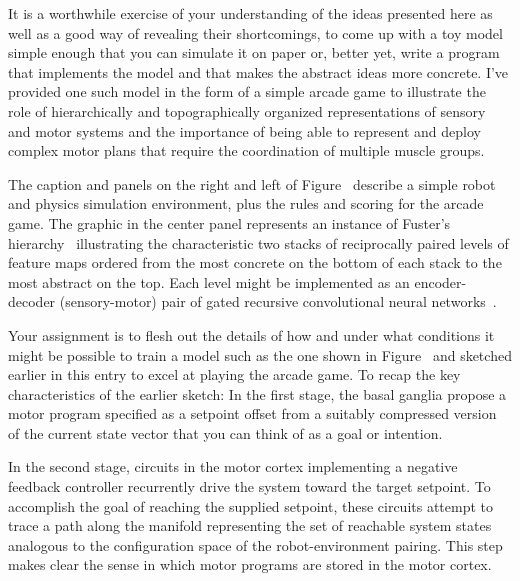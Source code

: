 
 It is a worthwhile exercise of your understanding of the ideas presented here {\emdash{}} as well as a good way of revealing their shortcomings, to come up with a toy model simple enough that you can simulate it on paper or, better yet, write a program that implements the model and that makes the abstract ideas more concrete. I've provided one such model in the form of a simple arcade game to illustrate the role of hierarchically and topographically organized representations of sensory and motor systems and the importance of being able to represent and deploy complex motor plans that require the coordination of multiple muscle groups. 

 The caption and panels on the right and left of Figure~{} describe a simple robot and physics simulation environment, plus the rules and scoring for the arcade game. The graphic in the center panel represents an instance of Fuster's hierarchy~\cite{FusterPREFRONTAL-CORTEX-15-CHAPTER_8} illustrating the characteristic two stacks of reciprocally paired levels of feature maps ordered from the most concrete on the bottom of each stack to the most abstract on the top. Each level might be implemented as an encoder-decoder (sensory-motor) pair of gated recursive convolutional neural networks~\cite{ChoetalCoRR-14}.

 Your assignment is to flesh out the details of how and under what conditions it might be possible to train a model such as the one shown in Figure~{} and sketched earlier in this entry to excel at playing the arcade game. To recap the key characteristics of the earlier sketch: In the first stage, the basal ganglia propose a motor program specified as a setpoint offset from a suitably compressed version of the current state vector that you can think of as a goal or intention. 

 In the second stage, circuits in the motor cortex implementing a negative feedback controller recurrently drive the system toward the target setpoint. To accomplish the goal of reaching the supplied setpoint, these circuits attempt to trace a path along the manifold representing the set of reachable system states analogous to the configuration space of the robot-environment pairing. This step makes clear the sense in which motor programs are stored in the motor cortex.

